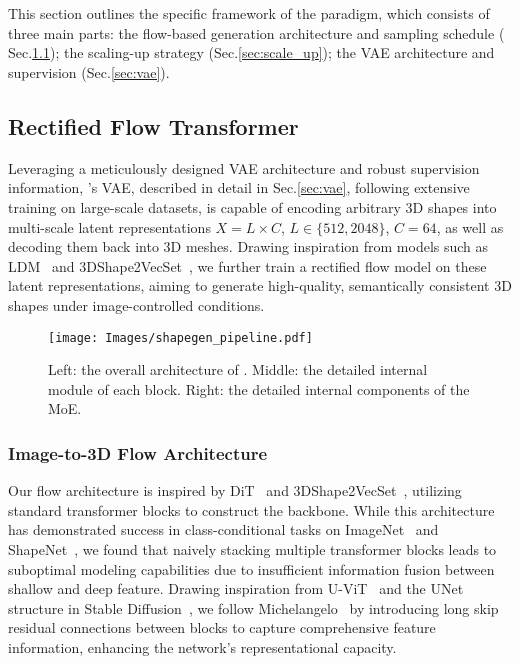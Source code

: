 \section{\method{}}
This section outlines the specific framework of the \method{} paradigm, which consists of three main parts: the flow-based generation architecture and sampling schedule ( Sec.\ref{sec:diffusion}); the scaling-up strategy (Sec.\ref{sec:scale_up}); the VAE architecture and supervision (Sec.\ref{sec:vae}).


\subsection{Rectified Flow Transformer}\label{sec:diffusion}




Leveraging a meticulously designed VAE architecture and robust supervision information, \method{}’s VAE, described in detail in Sec.\ref{sec:vae}, following extensive training on large-scale datasets, is capable of encoding arbitrary 3D shapes into multi-scale latent representations $X = L\times C$, $L\in \{512, 2048\}$, $C=64$, as well as decoding them back into 3D meshes. Drawing inspiration from models such as LDM~\cite{rombach2022high} and 3DShape2VecSet~\cite{zhang20233dshape2vecset}, we further train a rectified flow model on these latent representations, aiming to generate high-quality, semantically consistent 3D shapes under image-controlled conditions.


\begin{figure*}[!t]
\centering
\texttt{[image: Images/shapegen\_pipeline.pdf]}
\caption{Left: the overall architecture of \method{}. Middle: the detailed internal module of each block. Right: the detailed internal components of the MoE.}
\label{fig:TripoGen_pipeline}
\end{figure*}


\subsubsection{Image-to-3D Flow Architecture}
Our flow architecture is inspired by DiT~\cite{peebles2023scalable} and 3DShape2VecSet~\cite{zhang20233dshape2vecset}, utilizing standard transformer blocks to construct the backbone. While this architecture has demonstrated success in class-conditional tasks on ImageNet~\cite{deng2009imagenet} and ShapeNet~\cite{chang2015shapenet}, we found that naively stacking multiple transformer blocks leads to suboptimal modeling capabilities due to insufficient information fusion between shallow and deep feature. Drawing inspiration from U-ViT~\cite{bao2023all} and the UNet structure in Stable Diffusion~\cite{rombach2022high}, we follow Michelangelo~\cite{zhao2024michelangelo} by introducing long skip residual connections between blocks to capture comprehensive feature information, enhancing the network's representational capacity.


